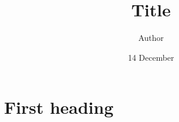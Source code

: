 \documentclass[a4paper,12pt]{article}
\title{Title}
\author{Author}
\date{14 December}
\begin{document}
\maketitle
\tableofcontents
\newpage

\section{First heading}
\end{document}
